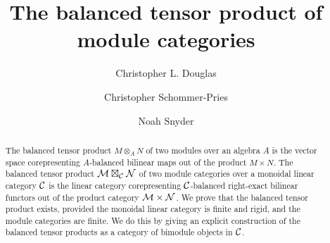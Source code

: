 \documentclass{amsart}
\begin{document}
\title{The balanced tensor product of module categories}

\begin{abstract}
The balanced tensor product $M \otimes_A N$ of two modules over an algebra $A$ is the vector space corepresenting $A$-balanced bilinear maps out of the product $M \times N$.  The balanced tensor product $\mathcal M \boxtimes_{\mathcal C} \mathcal N$ of two module categories over a monoidal linear category $\mathcal C$ is the linear category corepresenting $\mathcal C$-balanced right-exact bilinear functors out of the product category $\mathcal M \times \mathcal N$.  We prove that the balanced tensor product exists, provided the monoidal linear category is finite and rigid, and the module categories are finite.  We do this by giving an explicit construction of the balanced tensor products as a category of bimodule objects in $\mathcal C$.
\end{abstract}





\author{Christopher L. Douglas}
\address{Mathematical Institute\\ University of Oxford\\ Oxford OX1 3LB\\ United Kingdom}
      	
\author{Christopher Schommer-Pries}
\address{Department of Mathematics\\ Max Planck Institute for Mathematics \\ 53111 Bonn \\ Germany}

\author{Noah Snyder}
\address{Department of Mathematics\\ Indiana University\\ Bloomington, IN 47401\\ USA}
\end{document}
